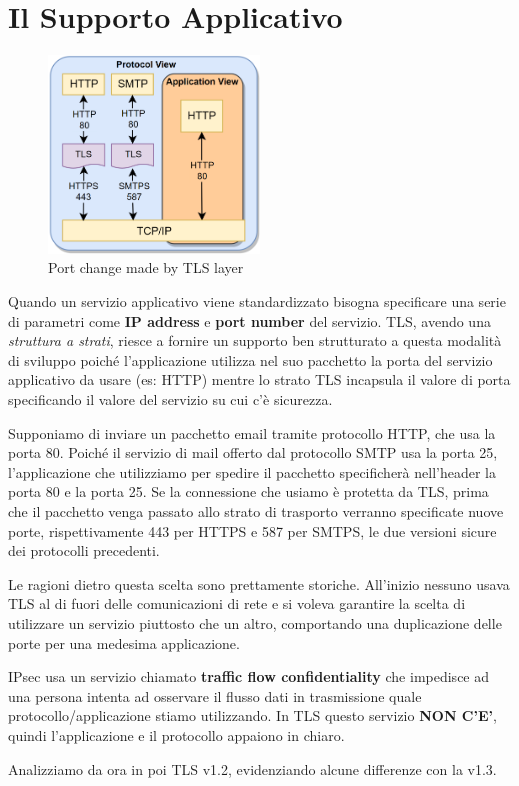 \section{Il Supporto Applicativo}
\begin{figure}
\vspace{-5mm}
    \centering
    \includegraphics[width=0.5\textwidth]{image/tlsencapsulation.png}
    \caption{Port change made by TLS layer}
    \label{fig:tlsencapsulation}
\end{figure}
Quando un servizio applicativo viene standardizzato bisogna specificare una serie di parametri come \textbf{IP address} e \textbf{port number} del servizio. TLS, avendo una \textit{struttura a strati}, riesce a fornire un supporto ben strutturato a questa modalità di sviluppo poiché l'applicazione utilizza nel suo pacchetto la porta del servizio applicativo da usare (es: HTTP) mentre lo strato TLS incapsula il valore di porta specificando il valore del servizio su cui c'è sicurezza.
\begin{example}
Supponiamo di inviare un pacchetto email tramite protocollo HTTP, che usa la porta 80. Poiché il servizio di mail offerto dal protocollo SMTP usa la porta 25, l'applicazione che utilizziamo per spedire il pacchetto specificherà nell'header la porta 80 e la porta 25. Se la connessione che usiamo è protetta da TLS, prima che il pacchetto venga passato allo strato di trasporto verranno specificate nuove porte, rispettivamente 443 per HTTPS e 587 per SMTPS, le due versioni sicure dei protocolli precedenti. 
\end{example}
\begin{remark}
Le ragioni dietro questa scelta sono prettamente storiche. All'inizio nessuno usava TLS al di fuori delle comunicazioni di rete e si voleva garantire la scelta di utilizzare un servizio piuttosto che un altro, comportando una duplicazione delle porte per una medesima applicazione.
\end{remark}
\begin{note}
IPsec usa un servizio chiamato \textbf{traffic flow confidentiality} che impedisce ad una persona intenta ad osservare il flusso dati in trasmissione quale protocollo/applicazione stiamo utilizzando. In TLS questo servizio \textbf{NON C'E'}, quindi l'applicazione e il protocollo appaiono in chiaro.
\end{note}
\begin{note}
Analizziamo da ora in poi TLS v1.2, evidenziando alcune differenze con la v1.3.
\end{note}
